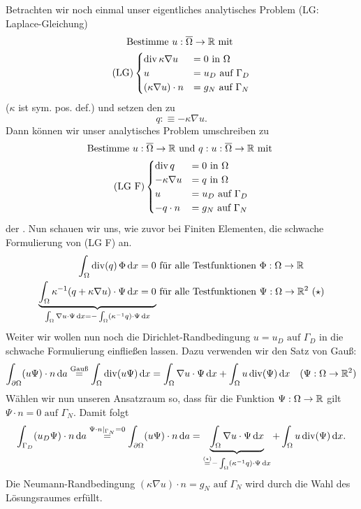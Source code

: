 Betrachten wir noch einmal unser eigentliches analytisches Problem (LG: Laplace-Gleichung) 
\begin{gather*}
 \text{Bestimme } u:\overline{\Omega} \to \mathbb{R} \text{ mit }\\	
	\text{(LG)}\begin{cases}
	\operatorname{div} \kappa \nabla u &= 0 \text{ in } \Omega\\
	u &= u_D \text{ auf } \Gamma_D \\
	(\kappa\nabla u) \cdot n &= g_N \text{ auf } \Gamma_N \\
	\end{cases}
\end{gather*}
($ \kappa $ ist sym. pos. def.) und setzen den  zu 
\[ q :\equiv - \kappa \nabla u. \]
Dann können wir unser analytisches Problem umschreiben zu 
\begin{gather*}
	\text{Bestimme } u:\overline{\Omega} \to \mathbb{R} \text{ und } q: u:\overline{\Omega} \to \mathbb{R} \text{ mit } \\
		\text{(LG F)}\begin{cases}
		\operatorname{div} q &= 0 \text{ in } \Omega\\
		- \kappa \nabla u &= q \text{ in } \Omega\\
		u &= u_D \text{ auf } \Gamma_D \\
		-q \cdot n &= g_N \text{ auf } \Gamma_N \\
		\end{cases}
\end{gather*} 
der . Nun schauen wir uns, wie zuvor bei Finiten Elementen, die schwache Formulierung von (LG F) an.
\begin{align*}
	\int_\Omega \operatorname{div}(q)\, \Phi \mathop{}\!\mathrm{d} x = 0 &\text{ für alle Testfunktionen } \Phi: \Omega \to \mathbb{R} \\
	\underbrace{\int_{\Omega} \kappa^{-1} (q + \kappa \nabla u) \cdot \Psi \mathop{}\!\mathrm{d} x = 0}_{\int_{\Omega} \nabla u \cdot \Psi \mathop{}\!\mathrm{d} x = - \int_{\Omega} (\kappa^{-1} q) \cdot \Psi \mathop{}\!\mathrm{d} x}  &\text{ für alle Testfunktionen } \Psi:\Omega \to \mathbb{R}^2 \ (\star)
\end{align*}
Weiter wir wollen nun noch die Dirichlet-Randbedingung $ 	u = u_D \text{ auf } \Gamma_D $ in die schwache Formulierung einfließen lassen. Dazu verwenden wir den Satz von Gauß:
\[ \int_{\partial\Omega} (u\Psi) \cdot n \mathop{}\!\mathrm{d} a \stackrel{\text{Gauß}}{=} \int_{\Omega} \operatorname{div}(u\Psi) \mathop{}\!\mathrm{d} x = \int_{\Omega} \nabla u \cdot \Psi \mathop{}\!\mathrm{d} x + \int_{\Omega} u \operatorname{div}(\Psi) \mathop{}\!\mathrm{d} x \quad (\Psi:\Omega \to \mathbb{R}^2) \]
Wählen wir nun unseren Ansatzraum so, dass  für die Funktion $ \Psi: \Omega \to \mathbb{R}$ gilt $ \Psi \cdot n = 0 \text{ auf } \Gamma_N $. Damit folgt
\begin{align*}
	\int_{\Gamma_D} (u_D\Psi) \cdot n \mathop{}\!\mathrm{d} a \stackrel{\Psi \cdot n|_{\Gamma_N} = 0}{=} \int_{\partial\Omega} (u\Psi) \cdot n \mathop{}\!\mathrm{d} a = \underbrace{\int_{\Omega} \nabla u \cdot \Psi \mathop{}\!\mathrm{d} x}_{\stackrel{(\star)}{=}- \int_{\Omega} (\kappa^{-1} q) \cdot \Psi \mathop{}\!\mathrm{d} x } + \int_{\Omega} u \operatorname{div}(\Psi) \mathop{}\!\mathrm{d} x.
\end{align*}
Die Neumann-Randbedingung $ (\kappa\nabla u) \cdot n = g_N \text{ auf } \Gamma_N $ wird durch die Wahl des Lösungsraumes erfüllt.


